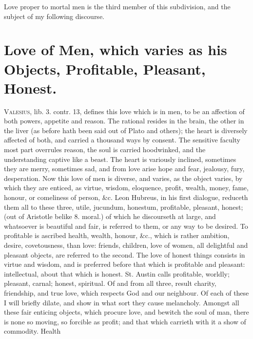 {Love proper to mortal men is the third member of this subdivision, and
the subject of my following discourse.


\section[Love of Men]{Love of Men, which varies as his Objects, Profitable, Pleasant, Honest.}

\lettrine{V}{alesius}, lib. 3. contr. 13, defines this love which is in men, to be
an affection of both powers, appetite and reason. The rational
resides in the brain, the other in the liver (as before hath been said
out of Plato and others); the heart is diversely affected of both, and
carried a thousand ways by consent. The sensitive faculty most part
overrules reason, the soul is carried hoodwinked, and the understanding
captive like a beast. The heart is variously inclined, sometimes
they are merry, sometimes sad, and from love arise hope and fear,
jealousy, fury, desperation. Now this love of men is diverse, and
varies, as the object varies, by which they are enticed, as virtue,
wisdom, eloquence, profit, wealth, money, fame, honour, or comeliness
of person, \&c. Leon Hubreus, in his first dialogue, reduceth them all
to these three, utile, jucundum, honestum, profitable, pleasant,
honest; (out of Aristotle belike 8. moral.) of which he discourseth at
large, and whatsoever is beautiful and fair, is referred to them, or
any way to be desired. To profitable is ascribed health, wealth,
honour, \&c., which is rather ambition, desire, covetousness, than love:
friends, children, love of women, all delightful and pleasant
objects, are referred to the second. The love of honest things consists
in virtue and wisdom, and is preferred before that which is profitable
and pleasant: intellectual, about that which is honest. St.
Austin calls profitable, worldly; pleasant, carnal; honest, spiritual.
Of and from all three, result charity, friendship, and true love,
which respects God and our neighbour. Of each of these I will briefly
dilate, and show in what sort they cause melancholy.
Amongst all these fair enticing objects, which procure love, and
bewitch the soul of man, there is none so moving, so forcible as
profit; and that which carrieth with it a show of commodity. Health
}
